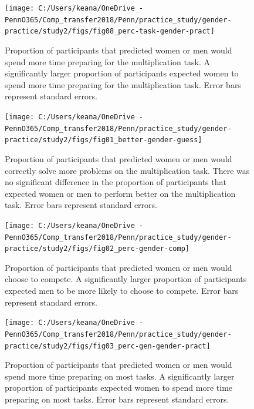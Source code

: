 \documentclass[a4paper, nobind]{templates/ociamthesis}
\begin{document}
\begin{figure}

{\centering \texttt{[image: C:/Users/keana/OneDrive - PennO365/Comp\_transfer2018/Penn/practice\_study/gender-practice/study2/figs/fig08\_perc-task-gender-pract]} 

}

\caption{Proportion of participants that predicted women or men would spend more time preparing for the multiplication task. A significantly larger proportion of participants expected women to spend more time preparing for the multiplication task. Error bars represent standard errors.}\label{fig:s203}
\end{figure}

\begin{figure}

{\centering \texttt{[image: C:/Users/keana/OneDrive - PennO365/Comp\_transfer2018/Penn/practice\_study/gender-practice/study2/figs/fig01\_better-gender-guess]} 

}

\caption{Proportion of participants that predicted women or men would correctly solve more problems on the multiplication task. There was no significant difference in the proportion of participants that expected women or men to perform better on the multiplication task. Error bars represent standard errors.}\label{fig:s204}
\end{figure}

\begin{figure}

{\centering \texttt{[image: C:/Users/keana/OneDrive - PennO365/Comp\_transfer2018/Penn/practice\_study/gender-practice/study2/figs/fig02\_perc-gender-comp]} 

}

\caption{Proportion of participants that predicted women or men would choose to compete. A significantly larger proportion of participants expected men to be more likely to choose to compete. Error bars represent standard errors.}\label{fig:s205}
\end{figure}

\begin{figure}

{\centering \texttt{[image: C:/Users/keana/OneDrive - PennO365/Comp\_transfer2018/Penn/practice\_study/gender-practice/study2/figs/fig03\_perc-gen-gender-pract]} 

}

\caption{Proportion of participants that predicted women or men would spend more time preparing on most tasks. A significantly larger proportion of participants expected women to spend more time preparing on most tasks. Error bars represent standard errors.}\label{fig:s206}
\end{figure}
\end{document}

